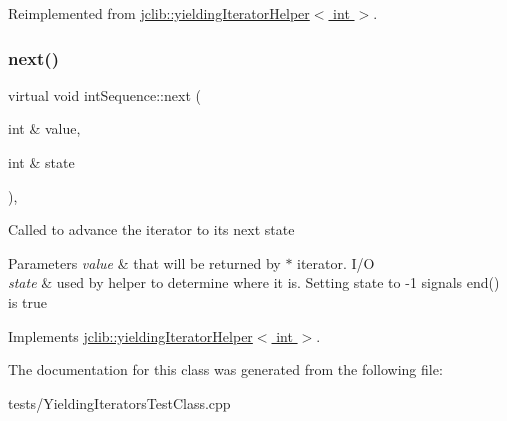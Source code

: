 Reimplemented from \hyperlink{classjclib_1_1yieldingIteratorHelper_a62f77cf3f5376e5997512907460f2d36}{jclib\+::yielding\+Iterator\+Helper$<$ int $>$}.

\mbox{\label{classintSequence_ab624bfe357dcb3b34cb7091e4a254d4e}} 
\subsubsection{\texorpdfstring{next()}{next()}}
{\footnotesize\ttfamily virtual void int\+Sequence\+::next (\begin{DoxyParamCaption}\item[{int \&}]{value,  }\item[{int \&}]{state }\end{DoxyParamCaption})\hspace{0.3cm}{\ttfamily [inline]}, {\ttfamily [virtual]}}

Called to advance the iterator to its next state 
\begin{DoxyParams}{Parameters}
{\em value} & that will be returned by $\ast$ iterator. I/O \\
\hline
{\em state} & used by helper to determine where it is. Setting state to -\/1 signals end() is true \\
\hline
\end{DoxyParams}


Implements \hyperlink{classjclib_1_1yieldingIteratorHelper_a620c17e7eb8ed695e3fb9add01da576d}{jclib\+::yielding\+Iterator\+Helper$<$ int $>$}.



The documentation for this class was generated from the following file\+:\begin{DoxyCompactItemize}
\item 
tests/Yielding\+Iterators\+Test\+Class.\+cpp\end{DoxyCompactItemize}
